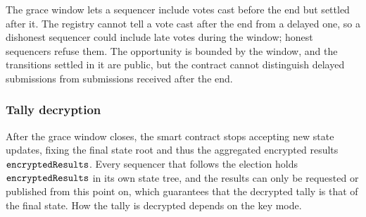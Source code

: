 The grace window lets a sequencer include votes cast before the end but settled after it. The registry cannot tell a vote cast after the end from a delayed one, so a dishonest sequencer could include late votes during the window; honest sequencers refuse them. The opportunity is bounded by the window, and the transitions settled in it are public, but the contract cannot distinguish delayed submissions from submissions received after the end.

\subsubsection{Tally decryption}
\label{sec:vocdoni-protocol:tally}

After the grace window closes, the \hlget{\processregistry} smart contract stops accepting new state updates, fixing the final state root and thus the aggregated encrypted results $\texttt{encryptedResults}$. Every sequencer that follows the election holds $\texttt{encryptedResults}$ in its own state tree, and the results can only be requested or published from this point on, which guarantees that the decrypted tally is that of the final state. How the tally is decrypted depends on the key mode.

